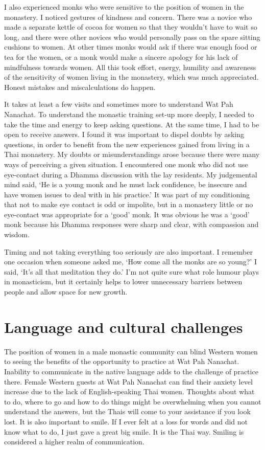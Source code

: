 I also experienced monks who were sensitive to the position of women in
the monastery. I noticed gestures of kindness and concern. There was a
novice who made a separate kettle of cocoa for women so that they
wouldn't have to wait so long, and there were other novices who would
personally pass on the spare sitting cushions to women. At other times
monks would ask if there was enough food or tea for the women, or a monk
would make a sincere apology for his lack of mindfulness towards women. 
All this took effort, energy, humility and awareness of the sensitivity
of women living in the monastery, which was much appreciated. Honest
mistakes and miscalculations do happen. 

It takes at least a few visits and sometimes more to understand Wat Pah
Nanachat. To understand the monastic training set-up more deeply, I
needed to take the time and energy to keep asking questions. At the same
time, I had to be open to receive answers. I found it was important to
dispel doubts by asking questions, in order to benefit from the new
experiences gained from living in a Thai monastery. My doubts or
misunderstandings arose because there were many ways of perceiving a
given situation. I encountered one monk who did not use eye-contact
during a Dhamma discussion with the lay residents. My judgemental mind
said, `He is a young monk and he must lack confidence, be insecure and
have women issues to deal with in his practice.' It was part of my
conditioning that not to make eye contact is odd or impolite, but in a
monastery little or no eye-contact was appropriate for a `good' monk. It
was obvious he was a `good' monk because his Dhamma responses were sharp
and clear, with compassion and wisdom. 

Timing and not taking everything too seriously are also important. I
remember one occasion when someone asked me, `How come all the monks are
so young?' I said, `It's all that meditation they do.' I'm not quite
sure what role humour plays in monasticism, but it certainly helps to
lower unnecessary barriers between people and allow space for new
growth. 

\section{Language and cultural challenges}

The position of women in a male monastic community can blind Western
women to seeing the benefits of the opportunity to practice at Wat Pah
Nanachat. Inability to communicate in the native language adds to the
challenge of practice there. Female Western guests at Wat Pah Nanachat
can find their anxiety level increase due to the lack of
English-speaking Thai women. Thoughts about what to do, where to go and
how to do things might be overwhelming when you cannot understand the
answers, but the Thais will come to your assistance if you look lost. It
is also important to smile. If I ever felt at a loss for words and did
not know what to do, I just gave a great big smile. It is the Thai way. 
Smiling is considered a higher realm of communication. 

